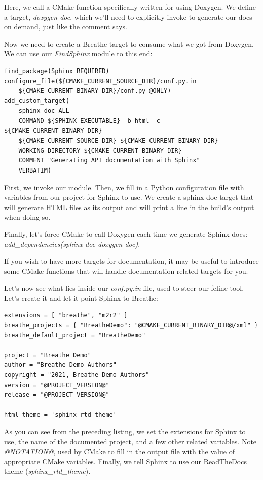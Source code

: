 Here, we call a CMake function specifically written for using Doxygen. We define a target, \textit{doxygen-doc}, which we'll need to explicitly invoke to generate our docs on demand, just like the comment says.

Now we need to create a Breathe target to consume what we got from Doxygen. We can use our \textit{FindSphinx} module to this end:


\begin{lstlisting}[style=styleCMake]
find_package(Sphinx REQUIRED)
configure_file(${CMAKE_CURRENT_SOURCE_DIR}/conf.py.in
	${CMAKE_CURRENT_BINARY_DIR}/conf.py @ONLY)
add_custom_target(
	sphinx-doc ALL
	COMMAND ${SPHINX_EXECUTABLE} -b html -c ${CMAKE_CURRENT_BINARY_DIR}
	${CMAKE_CURRENT_SOURCE_DIR} ${CMAKE_CURRENT_BINARY_DIR}
	WORKING_DIRECTORY ${CMAKE_CURRENT_BINARY_DIR}
	COMMENT "Generating API documentation with Sphinx"
	VERBATIM)

\end{lstlisting}

First, we invoke our module. Then, we fill in a Python configuration file with variables from our project for Sphinx to use. We create a sphinx-doc target that will generate HTML files as its output and will print a line in the build's output when doing so.

Finally, let's force CMake to call Doxygen each time we generate Sphinx docs: \textit{add\_dependencies(sphinx-doc doxygen-doc)}.

If you wish to have more targets for documentation, it may be useful to introduce some CMake functions that will handle documentation-related targets for you.

Let's now see what lies inside our \textit{conf.py.in} file, used to steer our feline tool. Let's create it and let it point Sphinx to Breathe:


\begin{lstlisting}[style=stylePython]
extensions = [ "breathe", "m2r2" ]
breathe_projects = { "BreatheDemo": "@CMAKE_CURRENT_BINARY_DIR@/xml" }
breathe_default_project = "BreatheDemo"

project = "Breathe Demo"
author = "Breathe Demo Authors"
copyright = "2021, Breathe Demo Authors"
version = "@PROJECT_VERSION@"
release = "@PROJECT_VERSION@"

html_theme = 'sphinx_rtd_theme'
\end{lstlisting}

As you can see from the preceding listing, we set the extensions for Sphinx to use, the name of the documented project, and a few other related variables. Note \textit{@NOTATION@}, used by CMake to fill in the output file with the value of appropriate CMake variables. Finally, we tell Sphinx to use our ReadTheDocs theme (\textit{sphinx\_rtd\_theme}).

